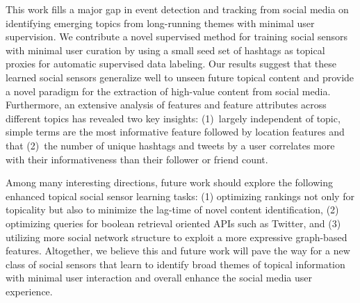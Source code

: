 This work fills a major gap in event detection and tracking from
social media on identifying emerging topics from long-running themes
with minimal user supervision.  We contribute a novel supervised
method for training social sensors with minimal user curation by using
a small seed set of hashtags as topical proxies for automatic
supervised data labeling.
Our results suggest that these learned social sensors generalize well
to unseen future topical content and provide a novel paradigm for the
extraction of high-value content from social media. Furthermore, an
extensive analysis of features and feature attributes across different
topics has revealed two key insights: (1)~largely independent of
topic, simple terms are the most informative feature followed by
location features and that (2)~the number of unique hashtags and
tweets by a user correlates more with their informativeness than their
follower or friend count.

Among many interesting directions, future work should explore the
following enhanced topical social sensor learning tasks: (1)
optimizing rankings not only for topicality but also to minimize the
lag-time of novel content identification, (2) optimizing queries for
boolean retrieval oriented APIs such as Twitter, and (3) utilizing
more social network structure to exploit a more expressive graph-based
features.  Altogether, we believe this and future work will pave
the way for a new class of social sensors that learn to
identify broad themes of topical information with minimal user
interaction and overall enhance the social media user experience.
